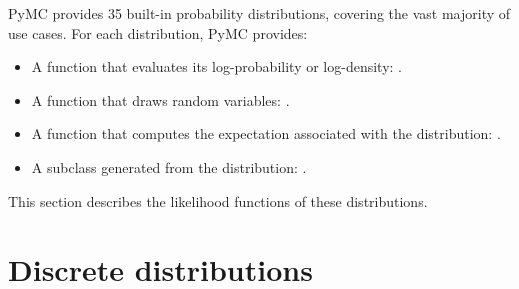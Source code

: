 PyMC provides 35 built-in probability distributions, covering the vast majority of use cases. For each distribution, PyMC provides:
\begin{itemize}
    \item A function that evaluates its log-probability or log-density: .
    \item A function that draws random variables: .
    \item A function that computes the expectation associated with the distribution: .
    \item A  subclass generated from the distribution: .
\end{itemize} 
This section describes the likelihood functions of these distributions. 

\newenvironment{paramlist}{
\begin{list}{}{
\setlength{\itemsep}{-2pt}
\setlength{\parsep}{-1pt}
\setlength{\topsep}{-1pt}}
 }{\end{list}}

 

\section{Discrete distributions}

